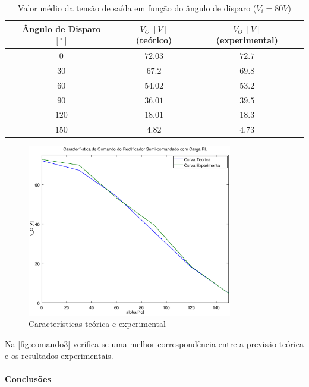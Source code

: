 \documentclass[a4paper,11pt]{article}
\numberwithin{equation}{section}
\begin{document}
\begin{table}[H]
\centering
\begin{tabular}{c c c c c c c}
\hfil & Ângulo de Disparo $[^\circ]$ & \hfil & $V_O\;[V]$ (teórico) & \hfil & $V_O\;[V]$ (experimental) & \hfil \\
\hline
			&$0$&	&$72.03$&		&$72.7$&\\
\rowcolor{SkyBlue}	&$30$&	&$67.2$&		&$69.8$&\\
			&$60$&	&$54.02$&		&$53.2$&\\
\rowcolor{SkyBlue}	&$90$&	&$36.01$&		&$39.5$&\\
			&$120$&	&$18.01$&		&$18.3$&\\
\rowcolor{SkyBlue}	&$150$&	&$4.82$&		&$4.73$&\\
\hline
\end{tabular}
\caption{Valor médio da tensão de saída em função do ângulo de disparo ($V_i = 80 V$)}
\label{tab:akpksemi}
\end{table}


\begin{figure}[H]
	\centering
	\includegraphics[keepaspectratio=true, width=0.8\textwidth]{img/comando3}
	\caption{Características teórica e experimental}
	\label{fig:comando3}
	\vspace{-0.8em}
\end{figure}

Na \autoref{fig:comando3} verifica-se uma melhor correspondência entre a previsão teórica e os resultados experimentais.

\paragraph{Conclusões} \mbox{}\
\end{document}
